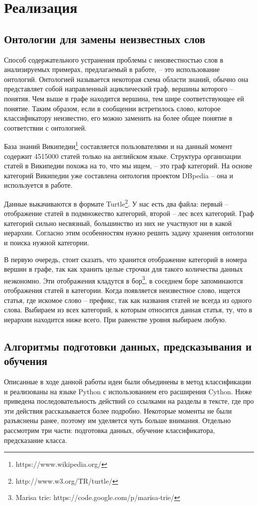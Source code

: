 \section{Реализация}
\subsection{Онтологии для замены неизвестных слов}\label{ontology}
Способ содержательного устранения проблемы с неизвестностью слов в анализируемых примерах,
предлагаемый в работе, -- это использование онтологий. Онтологией называется некоторая схема области
знаний, обычно она представляет собой направленный ациклический граф, вершины которого --
понятия. Чем выше в графе находится вершина, тем шире соответствующее ей понятие. Таким образом,
если в сообщении встретилось слово, которое классификатору неизвестно, его можно заменить на более
общее понятие в соответствии с онтологией.

База знаний Википедии\footnote{https://www.wikipedia.org/} составляется пользователями и на данный
момент содержит 4515000 статей только на английском языке. Структура организации статей в
Википедии похожа на то, что мы ищем, -- это граф категорий.
На основе категорий Википедии уже составлена онтология проектом DBpedia\cite{dbpedia-swj} -- она и
используется в работе.

Данные выкачиваются в формате
Turtle\footnote{http://www.w3.org/TR/turtle/}. У нас есть два файла: первый -- отображение статей в
подмножество категорий, второй -- лес всех категорий. Граф категорий сильно несвязный, большинство
из них не участвуют ни в какой иерархии. Согласно этим особенностям нужно решить задачу хранения
онтологии и поиска нужной категории.

В первую очередь, стоит сказать, что хранится отображение категорий в номера вершин в графе, так как
хранить целые строчки для такого количества данных неэкономно. Эти отображения кладутся в
бор\footnote{Marisa trie: https://code.google.com/p/marisa-trie/}, в
соседнем боре запоминаются отображения статей в категории.
Когда появляется неизвестное слово, ищется статья, где искомое
слово -- префикс, так как названия статей не всегда из одного слова.
Выбираем из всех категорий, к которым относится данная статья, ту, что в иерархии находится ниже всего. При равенстве уровня выбираем любую.

\subsection{Алгоритмы подготовки данных, предсказывания и обучения}
Описанные в ходе данной работы идеи были объединены в метод классификации
и реализованы на языке Python с использованием его расширения Cython. Ниже
приведена последовательность действий со ссылками на разделы в тексте, где про эти действия
рассказывается более подробно. Некоторые моменты не были разъяснены ранее, поэтому им уделяется чуть
больше внимания. Отдельно рассмотрим три части: подготовка данных, обучение классификатора,
предсказание класса.

